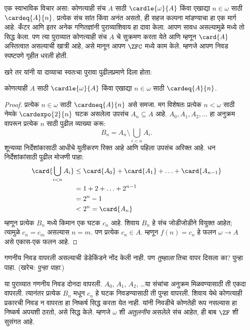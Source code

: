 \documentclass[../../../include/open-logic-section]{subfiles}
\begin{document}
\begin{ex}
एक स्वाभाविक विचार असा: कोणत्याही संच $A$ साठी $\cardle{\omega}{A}$ किंवा एखाद्या $n \in \omega$ साठी $\cardeq{A}{n}$. प्रत्येक संच सांत किंवा अनंत असतो, ही सहज कल्पना मांडण्याचा हा एक मार्ग आहे. कँटर आणि इतर अनेक गणितज्ञांनी पुराव्याशिवाय हा दावा केला. आपण सावध असल्यामुळे  मध्ये तो सिद्ध केला. पण त्या पुराव्यात कोणत्याही संच $A$ चे सुक्रमण करता येते आणि म्हणून $\card{A}$ अस्तित्वात असल्याची खात्री आहे, असे मानून आपण $\ZFC$ मध्ये काम केले. म्हणजे आपण निवड स्पष्टपणे गृहीत धरली होती.

खरे तर \citet{Dedekind1888} यांनी या दाव्याचा स्वतःचा पुरावा पुढीलप्रमाणे दिला होता:

\begin{thm}
कोणत्याही $A$ साठी $\cardle{\omega}{A}$ किंवा एखाद्या $n \in \omega$ साठी $\cardeq{A}{n}$.
\end{thm}

\begin{proof}
प्रत्येक $n \in \omega$ साठी $\cardneq{A}{n}$ असे समजा. मग विशेषतः प्रत्येक $n < \omega$ साठी नेमके $\cardexpo{2}{n}$ घटक असलेला उपसंच $A_n \subseteq A$ आहे. $A_0, A_1, A_2,
\ldots$ हा अनुक्रम वापरून प्रत्येक $n$ साठी पुढील व्याख्या करू:
\[
	B_n = A_n \setminus \bigcup_{i < n} A_i.
\]
शून्यव्या निर्देशांकासाठी आधीचे युतीकरण रिक्त आहे आणि पहिला उपसंच अरिक्त आहे. धन निर्देशांकांसाठी पुढील मोजणी पाहा:
\begin{align*}
	\card{\bigcup_{i < n}A_i}
	&\leq \card{A_0} + \card{A_1} + \ldots + \card{A_{n-1}}\\
	&=1 + 2 + \ldots + 2^{n-1}\\
	& = 2^n - 1\\
	& < 2^n = \card{A_n}
\end{align*}
म्हणून प्रत्येक $B_n$ मध्ये किमान एक घटक $c_n$ आहे. शिवाय $B_n$ हे संच जोडीजोडीने वियुक्त आहेत; त्यामुळे $c_n = c_m$ असल्यास $n = m$. पण प्रत्येक $c_n
\in A$. म्हणून $f(n) = c_n$ हे फलन $\omega \to A$ असे एकास-एक फलन आहे.
\end{proof}
\noindent
गणनीय निवड वापरली असल्याची डेडेकिंडने नोंद केली नाही. पण \emph{तुम्हाला} तिचा वापर दिसला का? पुन्हा पाहा. (खरेच: \emph{पुन्हा पाहा}.)

या पुराव्यात गणनीय निवड दोनदा वापरली. $A_0$, $A_1$, $A_2$, \dots\@ या संचांचा अनुक्रम मिळवण्यासाठी ती एकदा वापरली. त्यानंतर प्रत्येक $B_n$ मधून $c_n$ हे घटक निवडण्यासाठी ती पुन्हा वापरली. शिवाय येथे कोणत्याही प्रकारची निवड न वापरता हा निष्कर्ष सिद्ध करता येत नाही. \citet[पृ.~138]{Cohen1966} यांनी निवडीचे कोणतेही रूप नसल्यास हा निष्कर्ष अपयशी ठरतो, असे सिद्ध केले. म्हणजे $\omega$ शी \emph{अतुलनीय} असलेले संच आहेत, ही बाब $\ZF$ शी सुसंगत आहे.
\end{ex}
\end{document}
